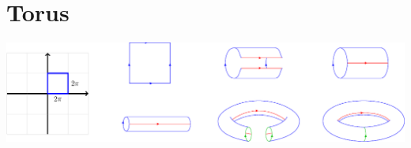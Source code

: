 \documentclass[11pt,openany]{article}
\renewcommand{\Im}{\operatorname*{Im}}
\begin{document}
%	
%	
%	
%	
%	
%	
%	

\newpage
\section{Torus}
\begin{center}
\includegraphics[scale=.85]{../tikz/grad-math-tikz-algebra/torus.pdf}
\end{center}
\end{document}
